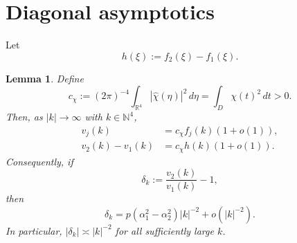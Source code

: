 \documentclass[11pt, reqno]{amsart}
\newtheorem{lemma}{Lemma}
\theoremstyle{remark}
\newcommand{\R}{\mathbb{R}}
\newcommand{\N}{\mathbb{N}}
\newcommand{\1}{\mathbf{1}}
\newcommand{\abs}[1]{\left\lvert #1 \right\rvert}
\newcommand{\what}[1]{\widehat{#1}}
\begin{document}
\section{Diagonal asymptotics}
Let
\begin{equation} \label{eqn:h}
h(\xi):=f_2(\xi)-f_1(\xi).
\end{equation}

\begin{lemma}\label{lem:diagonal-asymptotics}
Define
\[
c_\chi:=(2\pi)^{-4}\int_{\R^4}\abs{\what\chi(\eta)}^2\,d\eta = \int_D \chi(t)^2\,dt >0.
\]
Then, as $\abs{k}\to\infty$ with $k\in\N^4$,
\begin{align}
v_j(k)&=c_\chi f_j(k)(1+o(1)),
\label{eq:vi-asymptotic}
\\
v_2(k)-v_1(k)&=c_\chi h(k)(1+o(1)).
\label{eq:diff-asymptotic}
\end{align}
Consequently, if
\begin{equation}\label{eq:delta-def}
\delta_k:=\frac{v_2(k)}{v_1(k)}-1,
\end{equation}
then
\begin{equation}\label{eq:delta-asymptotic}
\delta_k = p(\alpha_1^2-\alpha_2^2)\abs{k}^{-2}+o(\abs{k}^{-2}).
\end{equation}
In particular, $\abs{\delta_k}\asymp \abs{k}^{-2}$ for all sufficiently large $k$.
\end{lemma}
\end{document}
